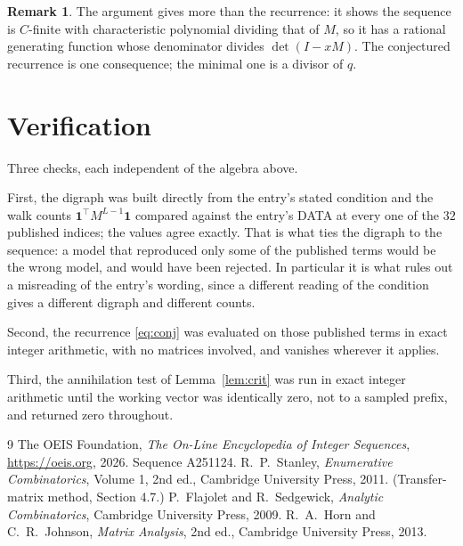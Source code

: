 \documentclass[11pt,a4paper]{article}
\theoremstyle{plain}
\theoremstyle{definition}
\newtheorem{remark}[theorem]{Remark}
\begin{document}
\begin{remark}
The argument gives more than the recurrence: it shows the sequence is $C$-finite with
characteristic polynomial dividing that of $M$, so it has a rational generating function
whose denominator divides $\det(I-xM)$. The conjectured recurrence is one consequence; the
minimal one is a divisor of $q$.
\end{remark}

\section{Verification}

Three checks, each independent of the algebra above.

First, the digraph was built directly from the entry's stated condition and the walk counts
$\mathbf{1}^{\!\top}M^{L-1}\mathbf{1}$ compared against the entry's DATA at
every one of the $32$ published indices; the values agree exactly. That is what ties
the digraph to the sequence: a model that reproduced only some of the published terms would
be the wrong model, and would have been rejected. In particular it is what rules out a
misreading of the entry's wording, since a different reading of the condition gives a
different digraph and different counts.

Second, the recurrence \eqref{eq:conj} was evaluated on those published terms in exact
integer arithmetic, with no matrices involved, and vanishes wherever it applies.

Third, the annihilation test of Lemma~\ref{lem:crit} was run in exact integer arithmetic
until the working vector was identically zero, not to a sampled prefix, and returned zero
throughout.

\begin{thebibliography}{9}
 The OEIS Foundation, \emph{The On-Line Encyclopedia of Integer
Sequences}, \url{https://oeis.org}, 2026. Sequence A251124.
 R.~P.~Stanley, \emph{Enumerative Combinatorics}, Volume 1, 2nd ed.,
Cambridge University Press, 2011. (Transfer-matrix method, Section 4.7.)
 P.~Flajolet and R.~Sedgewick, \emph{Analytic Combinatorics}, Cambridge
University Press, 2009.
 R.~A.~Horn and C.~R.~Johnson, \emph{Matrix Analysis}, 2nd ed., Cambridge
University Press, 2013.
\end{thebibliography}
\end{document}
